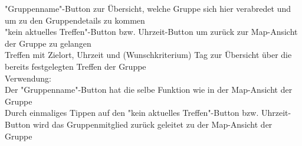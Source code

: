 "Gruppenname"-Button zur Übersicht, welche Gruppe sich hier verabredet und um zu den Gruppendetails zu kommen\\
"kein aktuelles Treffen"-Button bzw. Uhrzeit-Button um zurück zur Map-Ansicht der Gruppe zu gelangen\\
Treffen mit Zielort, Uhrzeit und (Wunschkriterium) Tag zur Übersicht über die bereits festgelegten Treffen der Gruppe\\
[Kleinüberschrift]Verwendung:\\
Der "Gruppenname"-Button  hat die selbe Funktion wie in der Map-Ansicht der Gruppe\\
Durch einmaliges Tippen auf den "kein aktuelles Treffen"-Button bzw. Uhrzeit-Button wird das Gruppenmitglied zurück geleitet zu der Map-Ansicht der Gruppe\\ \\

